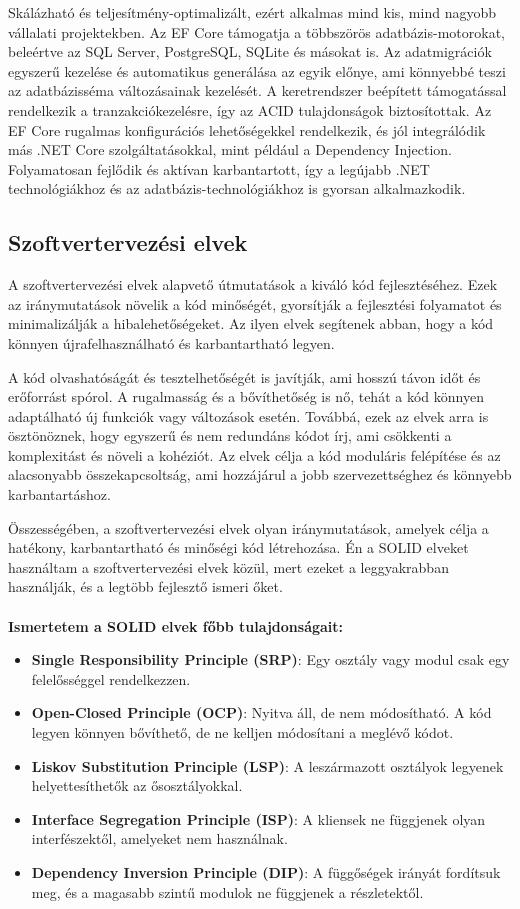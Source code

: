 Skálázható és teljesítmény-optimalizált, ezért alkalmas mind kis,
mind nagyobb vállalati projektekben. Az EF Core támogatja a többszörös adatbázis-motorokat, beleértve az SQL Server, PostgreSQL, SQLite és másokat is.
Az adatmigrációk egyszerű kezelése és automatikus generálása az egyik előnye, ami könnyebbé teszi az adatbázisséma változásainak kezelését.
A keretrendszer beépített támogatással rendelkezik a tranzakciókezelésre, így az ACID tulajdonságok biztosítottak. Az EF Core rugalmas konfigurációs lehetőségekkel rendelkezik,
és jól integrálódik más .NET Core szolgáltatásokkal, mint például a Dependency Injection. Folyamatosan fejlődik és aktívan karbantartott,
így a legújabb .NET technológiákhoz és az adatbázis-technológiákhoz is gyorsan alkalmazkodik.

\subsection*{Szoftvertervezési elvek}
A szoftvertervezési elvek alapvető útmutatások a kiváló kód fejlesztéséhez. Ezek az iránymutatások növelik a kód minőségét, gyorsítják a fejlesztési folyamatot és minimalizálják a hibalehetőségeket. Az ilyen elvek segítenek abban, hogy a kód könnyen újrafelhasználható és karbantartható legyen.

A kód olvashatóságát és tesztelhetőségét is javítják, ami hosszú távon időt és erőforrást spórol. A rugalmasság és a bővíthetőség is nő, tehát a kód könnyen adaptálható új funkciók vagy változások esetén. Továbbá, ezek az elvek arra is ösztönöznek, hogy egyszerű és nem redundáns kódot írj, ami csökkenti a komplexitást és növeli a kohéziót. Az elvek célja a kód moduláris felépítése és az alacsonyabb összekapcsoltság, ami hozzájárul a jobb szervezettséghez és könnyebb karbantartáshoz.

Összességében, a szoftvertervezési elvek olyan iránymutatások, amelyek célja a hatékony, karbantartható és minőségi kód létrehozása.
Én a SOLID elveket használtam a szoftvertervezési elvek közül, mert ezeket a leggyakrabban használják, és a legtöbb fejlesztő ismeri őket.
\\
\\
\textbf{Ismertetem a SOLID elvek főbb tulajdonságait:}
\begin{itemize}
    \item \textbf{Single Responsibility Principle (SRP)}: Egy osztály vagy modul csak egy felelősséggel rendelkezzen.
    \item \textbf{Open-Closed Principle (OCP)}: Nyitva áll, de nem módosítható. A kód legyen könnyen bővíthető, de ne kelljen módosítani a meglévő kódot.
    \item \textbf{Liskov Substitution Principle (LSP)}: A leszármazott osztályok legyenek helyettesíthetők az ősosztályokkal.
    \item \textbf{Interface Segregation Principle (ISP)}: A kliensek ne függjenek olyan interfészektől, amelyeket nem használnak.
    \item \textbf{Dependency Inversion Principle (DIP)}: A függőségek irányát fordítsuk meg, és a magasabb szintű modulok ne függjenek a részletektől.
\end{itemize}
